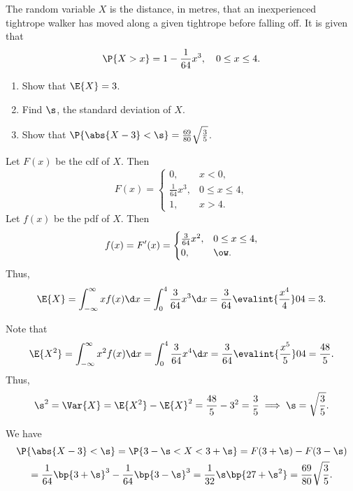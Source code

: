 \begin{problem}
    The random variable $X$ is the distance, in metres, that an inexperienced tightrope walker has moved along a given tightrope before falling off. It is given that \[\P{X > x} = 1 - \frac1{64} x^3, \quad 0 \leq x \leq 4.\]

    \begin{enumerate}
        \item Show that $\E{X} = 3$.
        \item Find $\s$, the standard deviation of $X$.
        \item Show that $\P{\abs{X - 3} < \s} = \frac{69}{80} \sqrt{\frac35}$.
    \end{enumerate}
\end{problem}
\begin{solution}
    \begin{ppart}
        Let $F(x)$ be the cdf of $X$. Then \[F(x) = \begin{cases}
            0, & x < 0,\\
            \frac1{64} x^3, & 0 \leq x \leq 4,\\
            1, & x > 4.
        \end{cases}\] Let $f(x)$ be the pdf of $X$. Then \[f(x) = F'(x) = \begin{cases}
            \frac3{64}x^2, & 0 \leq x \leq 4,\\
            0, & \ow.
        \end{cases}\]
        Thus, \[\E{X} = \int_{-\infty}^{\infty} x f(x) \d x = \int_0^4 \frac3{64} x^3 \d x = \frac3{64} \evalint{\frac{x^4}4}04 = 3.\]
    \end{ppart}
    \begin{ppart}
        Note that \[\E{X^2} = \int_{-\infty}^{\infty} x^2 f(x) \d x = \int_0^4 \frac3{64} x^4 \d x = \frac3{64} \evalint{\frac{x^5}5}04 = \frac{48}5.\] Thus, \[\s^2 = \Var{X} = \E{X^2} - \E{X}^2 = \frac{48}{5} - 3^2 = \frac35 \implies \s = \sqrt{\frac35}.\]
    \end{ppart}
    \begin{ppart}
        We have
        \begin{gather*}
            \P{\abs{X - 3} < \s} = \P{3 - \s < X < 3 + \s} = F(3 + \s) - F(3 - \s)\\
            = \frac1{64} \bp{3 + \s}^3 - \frac1{64} \bp{3 - \s}^3 = \frac1{32} \s \bp{27 + \s^2} = \frac{69}{80} \sqrt{\frac35}.
        \end{gather*}
    \end{ppart}
\end{solution}

